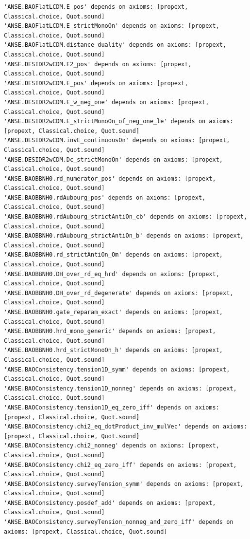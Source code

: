 \begin{lstlisting}
'ANSE.BAOFlatLCDM.E_pos' depends on axioms: [propext, Classical.choice, Quot.sound]
'ANSE.BAOFlatLCDM.E_strictMonoOn' depends on axioms: [propext, Classical.choice, Quot.sound]
'ANSE.BAOFlatLCDM.distance_duality' depends on axioms: [propext, Classical.choice, Quot.sound]
'ANSE.DESIDR2wCDM.E2_pos' depends on axioms: [propext, Classical.choice, Quot.sound]
'ANSE.DESIDR2wCDM.E_pos' depends on axioms: [propext, Classical.choice, Quot.sound]
'ANSE.DESIDR2wCDM.E_w_neg_one' depends on axioms: [propext, Classical.choice, Quot.sound]
'ANSE.DESIDR2wCDM.E_strictMonoOn_of_neg_one_le' depends on axioms: [propext, Classical.choice, Quot.sound]
'ANSE.DESIDR2wCDM.invE_continuousOn' depends on axioms: [propext, Classical.choice, Quot.sound]
'ANSE.DESIDR2wCDM.Dc_strictMonoOn' depends on axioms: [propext, Classical.choice, Quot.sound]
'ANSE.BAOBBNH0.rd_numerator_pos' depends on axioms: [propext, Classical.choice, Quot.sound]
'ANSE.BAOBBNH0.rdAubourg_pos' depends on axioms: [propext, Classical.choice, Quot.sound]
'ANSE.BAOBBNH0.rdAubourg_strictAntiOn_cb' depends on axioms: [propext, Classical.choice, Quot.sound]
'ANSE.BAOBBNH0.rdAubourg_strictAntiOn_b' depends on axioms: [propext, Classical.choice, Quot.sound]
'ANSE.BAOBBNH0.rd_strictAntiOn_Om' depends on axioms: [propext, Classical.choice, Quot.sound]
'ANSE.BAOBBNH0.DH_over_rd_eq_hrd' depends on axioms: [propext, Classical.choice, Quot.sound]
'ANSE.BAOBBNH0.DH_over_rd_degenerate' depends on axioms: [propext, Classical.choice, Quot.sound]
'ANSE.BAOBBNH0.gate_reparam_exact' depends on axioms: [propext, Classical.choice, Quot.sound]
'ANSE.BAOBBNH0.hrd_mono_generic' depends on axioms: [propext, Classical.choice, Quot.sound]
'ANSE.BAOBBNH0.hrd_strictMonoOn_h' depends on axioms: [propext, Classical.choice, Quot.sound]
'ANSE.BAOConsistency.tension1D_symm' depends on axioms: [propext, Classical.choice, Quot.sound]
'ANSE.BAOConsistency.tension1D_nonneg' depends on axioms: [propext, Classical.choice, Quot.sound]
'ANSE.BAOConsistency.tension1D_eq_zero_iff' depends on axioms: [propext, Classical.choice, Quot.sound]
'ANSE.BAOConsistency.chi2_eq_dotProduct_inv_mulVec' depends on axioms: [propext, Classical.choice, Quot.sound]
'ANSE.BAOConsistency.chi2_nonneg' depends on axioms: [propext, Classical.choice, Quot.sound]
'ANSE.BAOConsistency.chi2_eq_zero_iff' depends on axioms: [propext, Classical.choice, Quot.sound]
'ANSE.BAOConsistency.surveyTension_symm' depends on axioms: [propext, Classical.choice, Quot.sound]
'ANSE.BAOConsistency.posdef_add' depends on axioms: [propext, Classical.choice, Quot.sound]
'ANSE.BAOConsistency.surveyTension_nonneg_and_zero_iff' depends on axioms: [propext, Classical.choice, Quot.sound]
\end{lstlisting}
